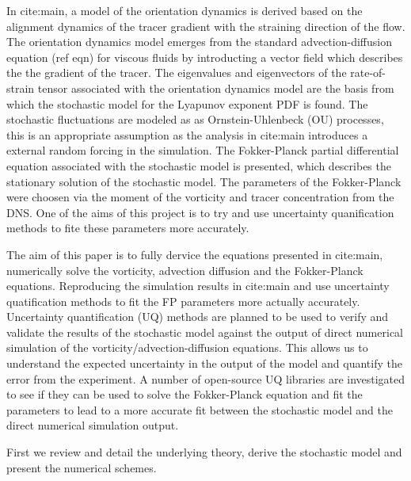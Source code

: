   In cite:main, a model of the orientation dynamics is derived based on the alignment dynamics of the tracer gradient with the straining direction of the flow. 
  The orientation dynamics model emerges from the standard advection-diffusion equation (ref eqn) for viscous fluids by introducting a vector field which describes the 
  the gradient of the tracer. The eigenvalues and eigenvectors of the rate-of-strain tensor associated with the orientation dynamics model are the basis from which the stochastic model for the Lyapunov exponent PDF is found.
  The stochastic fluctuations are modeled as as Ornstein-Uhlenbeck (OU) processes, this is an appropriate assumption as the analysis in cite:main introduces a external random forcing in the simulation. 
  The Fokker-Planck partial differential equation associated with the stochastic model is presented, which describes the stationary solution of the stochastic model. 
  The parameters of the Fokker-Planck were choosen via the moment of the vorticity and tracer concentration from the DNS. 
  One of the aims of this project is to try and use uncertainty quanification methods to fite these parameters more accurately.

  The aim of this paper is to fully dervice the equations presented in cite:main, numerically solve the vorticity, advection diffusion and the Fokker-Planck equations. Reproducing the simulation results in cite:main and
  use uncertainty quatification methods to fit the FP parameters more actually accurately.
  Uncertainty quantification (UQ) methods are planned to be used to verify and validate the results of the stochastic model against the output of direct numerical simulation of the vorticity/advection-diffusion equations. 
  This allows us to understand the expected uncertainty in the output of the model and quantify the error from the experiment. A number of open-source UQ libraries are investigated to see if they can be used to solve 
  the Fokker-Planck equation and fit the parameters to lead to a more accurate fit between the stochastic model and the direct numerical simulation output.

  First we review and detail the underlying theory, derive the stochastic model and present the numerical schemes.
%
